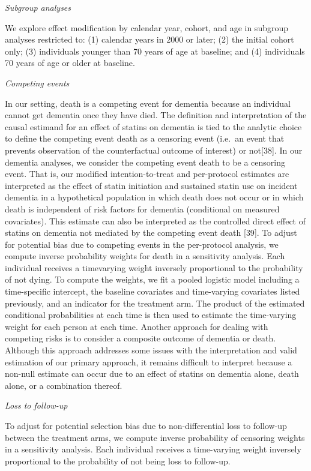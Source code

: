 \documentclass[
]{book}
\begin{document}
\emph{Subgroup analyses}

We explore effect modification by calendar year, cohort, and age in subgroup analyses restricted to: (1) calendar years in 2000 or later; (2) the initial cohort only; (3) individuals younger than 70 years of age at baseline; and (4) individuals 70 years of age or older at baseline.

\emph{Competing events}

In our setting, death is a competing event for dementia because an individual cannot get dementia once they have died. The definition and interpretation of the causal estimand for an effect of statins on dementia is tied to the analytic choice to define the competing event death as a censoring event (i.e.~an event that prevents observation of the counterfactual outcome of interest) or not{[}38{]}. In our dementia analyses, we consider the competing event death to be a censoring event. That is, our modified intention-to-treat and per-protocol estimates are interpreted as the effect of statin initiation and sustained statin use on incident dementia in a hypothetical population in which death does not occur or in which death is independent of risk factors for dementia (conditional on measured covariates). This estimate can also be interpreted as the controlled direct effect of statins on dementia not mediated by the competing event death {[}39{]}. To adjust for potential bias due to competing events in the per-protocol analysis, we compute inverse probability weights for death in a sensitivity analysis. Each individual receives a timevarying weight inversely proportional to the probability of not dying. To compute the weights, we fit a pooled logistic model including a time-specific intercept, the baseline covariates and time-varying covariates listed previously, and an indicator for the treatment arm. The product of the estimated conditional probabilities at each time is then used to estimate the time-varying weight for each person at each time. Another approach for dealing with competing risks is to consider a composite outcome of dementia or death. Although this approach addresses some issues with the interpretation and valid estimation of our primary approach, it remains difficult to interpret because a non-null estimate can occur due to an effect of statins on dementia alone, death alone, or a combination thereof.

\emph{Loss to follow-up}

To adjust for potential selection bias due to non-differential loss to follow-up between the treatment arms, we compute inverse probability of censoring weights in a sensitivity analysis. Each individual receives a time-varying weight inversely proportional to the probability of not being loss to follow-up.
\end{document}
